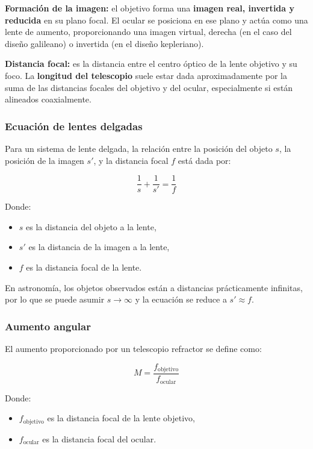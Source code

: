 \textbf{Formación de la imagen:} el objetivo forma una \textbf{imagen real, invertida y reducida} en su plano focal. El ocular se posiciona en ese plano y actúa como una lente de aumento, proporcionando una imagen virtual, derecha (en el caso del diseño galileano) o invertida (en el diseño kepleriano).

\textbf{Distancia focal:} es la distancia entre el centro óptico de la lente objetivo y su foco. La \textbf{longitud del telescopio} suele estar dada aproximadamente por la suma de las distancias focales del objetivo y del ocular, especialmente si están alineados coaxialmente.

\subsubsection*{Ecuación de lentes delgadas}

Para un sistema de lente delgada, la relación entre la posición del objeto $s$, la posición de la imagen $s'$, y la distancia focal $f$ está dada por:

\begin{equation}
	\frac{1}{s} + \frac{1}{s'} = \frac{1}{f}
	\label{eq:lente_delgada}
\end{equation}

Donde:
\begin{itemize}
	\item $s$ es la distancia del objeto a la lente,
	\item $s'$ es la distancia de la imagen a la lente,
	\item $f$ es la distancia focal de la lente.
\end{itemize}

En astronomía, los objetos observados están a distancias prácticamente infinitas, por lo que se puede asumir $s \to \infty$ y la ecuación se reduce a $s' \approx f$.

\subsubsection*{Aumento angular}

El aumento proporcionado por un telescopio refractor se define como:

\begin{equation}
	M = \frac{f_\text{objetivo}}{f_\text{ocular}}
	\label{eq:aumento_telescopio}
\end{equation}

Donde:
\begin{itemize}
	\item $f_\text{objetivo}$ es la distancia focal de la lente objetivo,
	\item $f_\text{ocular}$ es la distancia focal del ocular.
\end{itemize}

